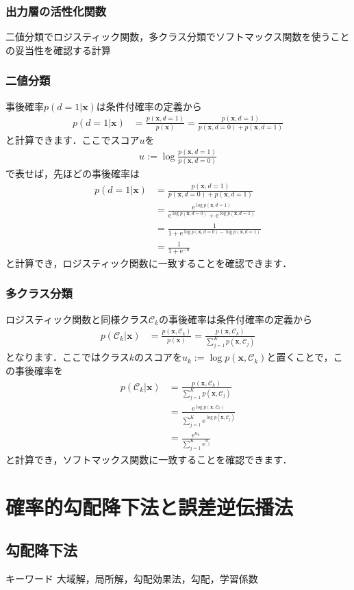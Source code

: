 \documentclass[a4paper,10pt]{jsarticle}
\theoremstyle{definition}
\newcommand{\eq}[1]{\begin{align}#1\end{align}}
\begin{document}
%
\subsubsection{出力層の活性化関数}
二値分類でロジスティック関数，多クラス分類でソフトマックス関数を使うことの妥当性を確認する計算
\subsubsection*{二値分類}
事後確率$p(d=1|\mathbf{x})$は条件付確率の定義から
\eq{p(d=1|\mathbf{x})
	&=\frac{p(\mathbf{x},d=1)}{p(\mathbf{x})}
	=\frac{p(\mathbf{x},d=1)}{p(\mathbf{x},d=0)+p(\mathbf{x},d=1)}}
と計算できます．ここでスコア$u$を
\eq{u:=\log\frac{p(\mathbf{x},d=1)}{p(\mathbf{x},d=0)}}
で表せば，先ほどの事後確率は
\eq{p(d=1|\mathbf{x})
	&=\frac{p(\mathbf{x},d=1)}{p(\mathbf{x},d=0)+p(\mathbf{x},d=1)}\\
	&=\frac{\mathrm{e}^{\log p(\mathbf{x},d=1)}}{\mathrm{e}^{\log p(\mathbf{x},d=0)}+\mathrm{e}^{\log p(\mathbf{x},d=1)}}\\
	&=\frac{1}{1+\mathrm{e}^{\log p(\mathbf{x},d=0) - \log p(\mathbf{x},d=1)}}\\
	&=\frac{1}{1+\mathrm{e}^{-u}}}
と計算でき，ロジスティック関数に一致することを確認できます．
\subsubsection*{多クラス分類}
ロジスティック関数と同様クラス$\mathcal{C}_k$の事後確率は条件付確率の定義から
\eq{p(\mathcal{C}_k|\mathbf{x})
	&=\frac{p(\mathbf{x},\mathcal{C}_k)}{p(\mathbf{x})}=\frac{p(\mathbf{x},\mathcal{C}_k)}{\sum_{j=1}^Kp(\mathbf{x},\mathcal{C}_j)}}
となります．ここではクラス$k$のスコアを$u_k:=\log p(\mathbf{x},\mathcal{C}_k)$と置くことで，この事後確率を
\eq{p(\mathcal{C}_k|\mathbf{x})
	&=\frac{p(\mathbf{x},\mathcal{C}_k)}{\sum_{j=1}^Kp(\mathbf{x},\mathcal{C}_j)}\\
	&=\frac{\mathrm{e}^{\log p(\mathbf{x},\mathcal{C}_k)}}{\sum_{j=1}^K\mathrm{e}^{\log p(\mathbf{x},\mathcal{C}_j)}}\\
	&=\frac{\mathrm{e}^{u_k}}{\sum_{j=1}^K\mathrm{e}^{u_j}}}
と計算でき，ソフトマックス関数に一致することを確認できます．

\section{確率的勾配降下法と誤差逆伝播法}
%
\subsection{勾配降下法}
\begin{itembox}[l]{キーワード}
大域解，局所解，勾配効果法，勾配，学習係数
\end{itembox}
\end{document}

